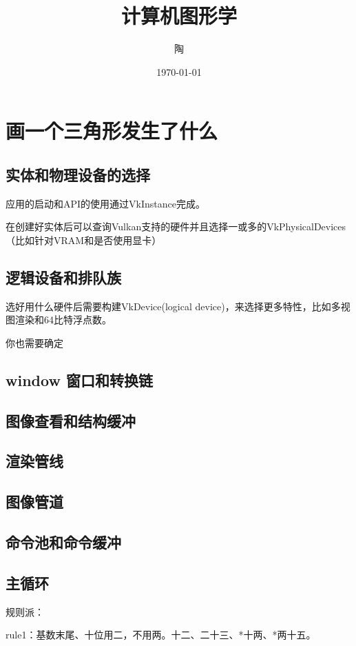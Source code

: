 \documentclass{ctexart}
\title{计算机图形学}
\author{陶}
\date{\today}
\begin{document}
\maketitle
\tableofcontents

\section{画一个三角形发生了什么}
\label{sec:first}
\subsection{实体和物理设备的选择}
应用的启动和API的使用通过VkInstance完成。

在创建好实体后可以查询Vulkan支持的硬件并且选择一或多的VkPhysicalDevices（比如针对VRAM和是否使用显卡）

\subsection{逻辑设备和排队族}
选好用什么硬件后需要构建VkDevice(logical device)，来选择更多特性，比如多视图渲染和64比特浮点数。

你也需要确定


\subsection{window 窗口和转换链}
\subsection{图像查看和结构缓冲}
\subsection{渲染管线}
\subsection{图像管道}
\subsection{命令池和命令缓冲}
\subsection{主循环}




规则派：

rule1：基数末尾、十位用二，不用两。十二、二十三、*十两、*两十五。
\end{document}
